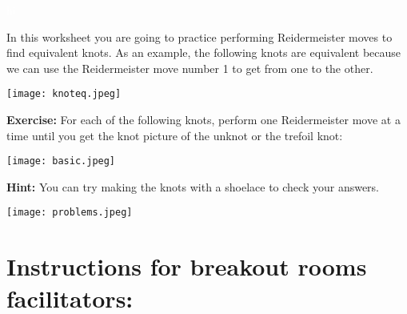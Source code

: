\documentclass[12pt,letterpaper]{article}
\begin{document}
\textcolor{white}{hi}

In this worksheet you are going to practice performing Reidermeister moves to find equivalent knots. As an example, the following knots are equivalent because we can use the Reidermeister move number 1 to get from one to the other.

\begin{center}
    \texttt{[image: knoteq.jpeg]}
\end{center}

\textbf{Exercise:} For each of the following knots, perform one Reidermeister move at a time until you get the knot picture of the unknot or the trefoil knot:
\begin{center}
    \texttt{[image: basic.jpeg]}
\end{center}

\textbf{Hint:} You can try making the knots with a shoelace to check your answers.

\begin{center}
    \texttt{[image: problems.jpeg]}
\end{center}

\newpage

\section*{Instructions for breakout rooms facilitators:}
\end{document}
